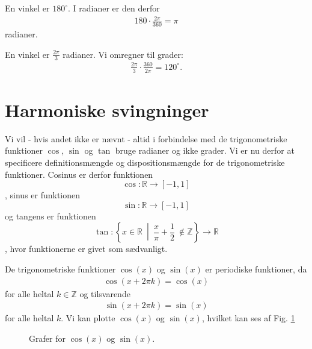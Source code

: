 \begin{exa}
	En vinkel er $180^\circ$. I radianer er den derfor 
	\begin{align*}
		180\cdot \frac{2\pi}{360} = \pi
	\end{align*}
	radianer. 
\end{exa}
\begin{exa}
	En vinkel er $\frac{2\pi}{3}$ radianer. Vi omregner til grader:
	\begin{align*}
		\frac{2\pi}{3} \cdot \frac{360}{2\pi} = 120^\circ.
	\end{align*}
\end{exa}

\section*{Harmoniske svingninger}
Vi vil - hvis andet ikke er nævnt - altid i forbindelse med de trigonometriske funktioner $\cos$, $\sin$ og $\tan$ bruge radianer og ikke grader. Vi er nu derfor at specificere definitionsmængde og dispositionsmængde for de trigonometriske funktioner. Cosinus er derfor funktionen $$\cos : \mathbb{R} \to [-1,1]$$
, sinus er funktionen 
$$\sin:\mathbb{R} \to [-1,1]$$ 
og tangens er funktionen
 $$\tan : 
\left\{x\in \mathbb{R}\ \middle| \  \frac{x}{\pi} + \frac{1}{2}\ \notin \mathbb{Z}  \right\} \to \mathbb{R}$$,
hvor funktionerne er givet som sædvanligt.


De trigonometriske funktioner $\cos(x)$ og $\sin(x)$ er periodiske funktioner, da 
\begin{align*}
\cos(x + 2\pi k) = \cos(x) 
\end{align*}
for alle heltal $k\in \mathbb{Z}$ og tilsvarende
\begin{align*}
\sin(x + 2\pi k) = \sin(x)
\end{align*}
for alle heltal $k$. Vi kan plotte $\cos(x)$ og $\sin(x)$, hvilket kan ses af Fig. \ref{fig:trig}

\begin{figure}[H]
\centering
{}
\caption{Grafer for $\cos(x)$ og $\sin(x)$.}
\label{fig:trig}
\end{figure}

